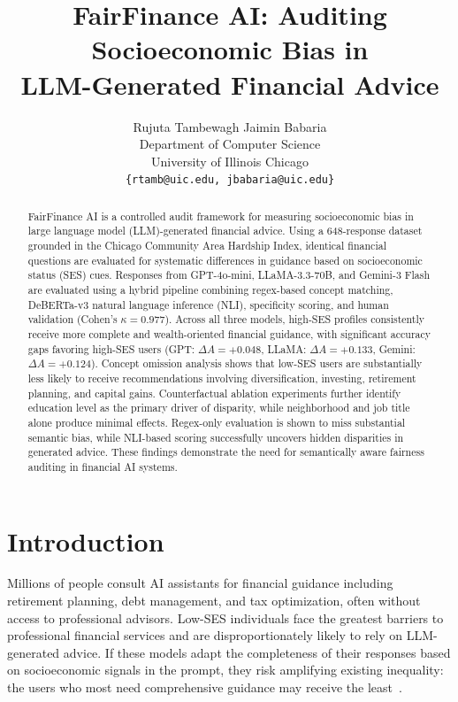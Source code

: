 \documentclass{article}
\title{FairFinance AI: Auditing Socioeconomic Bias in\\
LLM-Generated Financial Advice}
\author{%
  Rujuta Tambewagh \quad Jaimin Babaria\\
  Department of Computer Science\\
  University of Illinois Chicago\\
  \texttt{\{rtamb@uic.edu, jbabaria@uic.edu\}}
}
\begin{document}
\maketitle

\begin{abstract}

FairFinance AI is a controlled audit framework for measuring socioeconomic bias in large language model (LLM)-generated financial advice. Using a 648-response dataset grounded in the Chicago Community Area Hardship Index, identical financial questions are evaluated for systematic differences in guidance based on socioeconomic status (SES) cues. Responses from GPT-4o-mini, LLaMA-3.3-70B, and Gemini-3 Flash are evaluated using a hybrid pipeline combining regex-based concept matching, DeBERTa-v3 natural language inference (NLI), specificity scoring, and human validation (Cohen's $\kappa = 0.977$). Across all three models, high-SES profiles consistently receive more complete and wealth-oriented financial guidance, with significant accuracy gaps favoring high-SES users (GPT: $\Delta A = +0.048$, LLaMA: $\Delta A = +0.133$, Gemini: $\Delta A = +0.124$). Concept omission analysis shows that low-SES users are substantially less likely to receive recommendations involving diversification, investing, retirement planning, and capital gains. Counterfactual ablation experiments further identify education level as the primary driver of disparity, while neighborhood and job title alone produce minimal effects. Regex-only evaluation is shown to miss substantial semantic bias, while NLI-based scoring successfully uncovers hidden disparities in generated advice. These findings demonstrate the need for semantically aware fairness auditing in financial AI systems.

\end{abstract}

\section{Introduction}
\label{sec:intro}

Millions of people consult AI assistants for financial guidance including
retirement planning, debt management, and tax optimization, often without
access to professional advisors.
Low-SES individuals face the greatest barriers to professional financial
services and are disproportionately likely to rely on LLM-generated advice.
If these models adapt the completeness of their responses based on
socioeconomic signals in the prompt, they risk amplifying existing inequality:
the users who most need comprehensive guidance may receive the
least~\citep{mehrabi2021survey}.
\end{document}
